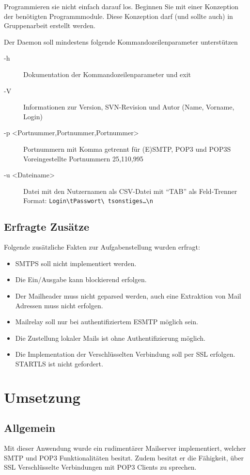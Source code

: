 \documentclass[final,a4paper,11pt,notitlepage,halfparskip]{scrreprt}
\begin{document}
Programmieren sie nicht einfach darauf los. Beginnen Sie mit einer Konzeption 
der benötigten Programmmodule. Diese Konzeption darf (und sollte auch) in 
Gruppenarbeit erstellt werden.

Der Daemon soll mindestens folgende Kommandozeilenparameter unterstützen
\begin{description}
  \item[-h] Dokumentation der Kommandozeilenparameter und exit
  \item[-V] Informationen zur Version, SVN-Revision und Autor (Name, Vorname, Login)
  \item[-p <Portnummer,Portnummer,Portnummer>] Portnummern mit Komma getrennt
            für (E)SMTP, POP3 und POP3S\\ 
            Voreingestellte Portnummern 25,110,995
  \item[-u <Dateiname>] Datei mit den Nutzernamen als CSV-Datei mit "`TAB"' als 
            Feld-Trenner\\ 
	    Format: \texttt{Login\textbackslash tPasswort\textbackslash
	    tsonstiges\dots\textbackslash n}
\end{description} 

\section{Erfragte Zusätze}
Folgende zusätzliche Fakten zur Aufgabenstellung wurden erfragt:
\begin{itemize}
  \item SMTPS soll nicht implementiert werden.
  \item Die Ein/Ausgabe kann blockierend erfolgen.
  \item Der Mailheader muss nicht geparsed werden, auch eine Extraktion von
        Mail Adressen muss nicht erfolgen.
  \item Mailrelay soll nur bei authentifiziertem ESMTP möglich sein.
  \item Die Zustellung lokaler Mails ist ohne Authentifizierung möglich. 
  \item Die Implementation der Verschlüsselten Verbindung soll per SSL 
        erfolgen. STARTLS ist nicht gefordert.
\end{itemize}



\chapter{Umsetzung}
\section{Allgemein}\label{sec:umsetzung-allgemein}
Mit dieser Anwendung wurde ein rudimentärer Mailserver implementiert, welcher
SMTP und POP3 Funktionalitäten besitzt. Zudem besitzt er die Fähigkeit, über SSL
Verschlüsselte Verbindungen mit POP3 Clients zu sprechen.
\end{document}
